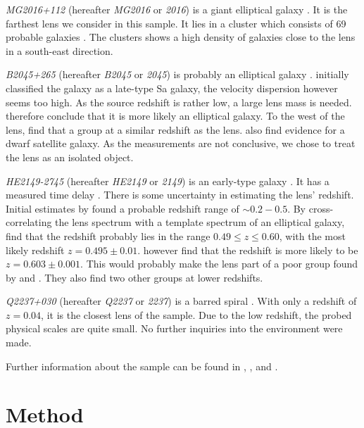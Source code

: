 \documentclass[10pt]{article}
\begin{document}
\textit{MG2016+112} (hereafter \textit{MG2016} or \textit{2016}) is a giant elliptical galaxy \citep{1984Sci...223...46L,1986AJ.....91..991S}. It is the farthest lens we consider in this sample. It lies in a cluster which consists of 69 probable galaxies \citep{2003MNRAS.344..337T}. The clusters shows a high density of galaxies close to the lens in a south-east direction.

\textit{B2045+265} (hereafter \textit{B2045} or \textit{2045}) is probably an elliptical galaxy \citep{2007MNRAS.378..109M}. \cite{1999AJ....117..658F} initially classified the galaxy as a late-type Sa galaxy, the velocity dispersion however seems too high. As the source redshift is rather low, a large lens mass is needed. \cite{2007MNRAS.378..109M} therefore conclude that it is more likely an elliptical galaxy. To the west of the lens, \cite{1999AJ....117..658F} find that a group at a similar redshift as the lens. \cite{2007MNRAS.378..109M} also find evidence for a dwarf satellite galaxy. As the measurements are not conclusive, we chose to treat the lens as an isolated object.

\textit{HE2149-2745} (hereafter \textit{HE2149} or \textit{2149}) is an early-type galaxy \citep{2007A&A...465...51E}. It has a measured time delay \citep{2002A&A...383...71B}. There is some uncertainty in estimating the lens' redshift. Initial estimates by \cite{1996A&A...315L.405W,2000ApJ...543..131K} found a probable redshift range of $\sim0.2-0.5$. By cross-correlating the lens spectrum with a template spectrum of an elliptical galaxy, \cite{2002A&A...383...71B} find that the redshift probably lies in the range $0.49\leq z \leq 0.60$, with the most likely redshift $z=0.495\pm0.01$. \cite{2007A&A...465...51E} however find that the redshift is more likely to be $z=0.603\pm0.001$. This would probably make the lens part of a poor group found by \cite{2006ApJ...641..169M} and \cite{2006ApJ...646...85W}. They also find two other groups at lower redshifts.

\textit{Q2237+030} (hereafter \textit{Q2237} or \textit{2237}) is a barred spiral \citep{1988AJ.....95.1331Y}. With only a redshift of $z=0.04$, it is the closest lens of the sample. Due to the low redshift, the probed physical scales are quite small. No further inquiries into the environment were made.

Further information about the sample can be found in \cite{leier11phd}, \cite{2011ApJ...740...97L}, and \cite{2012A&A...538A..99S}.


\section{Method}\label{sec:method}
\end{document}

